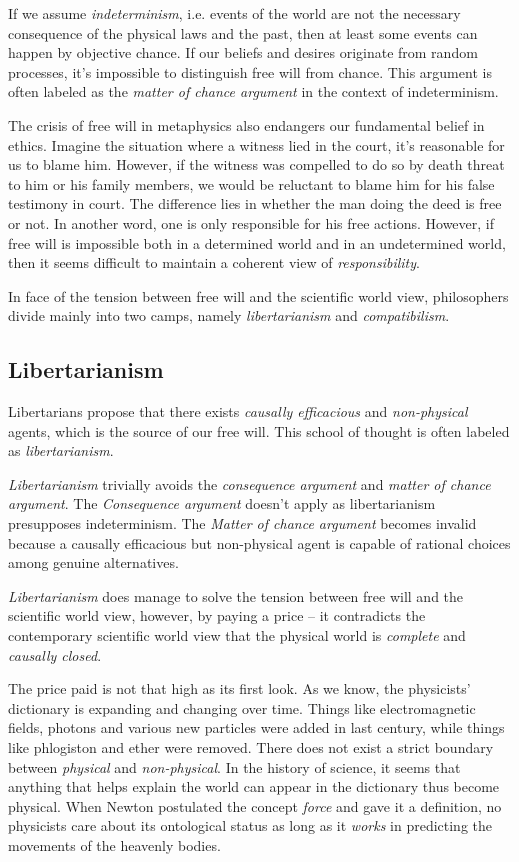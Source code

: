 If we assume \emph{indeterminism}, i.e. events of the world are not the necessary consequence of the physical laws and the past, then at least some events can happen by objective chance. If our beliefs and desires originate from random processes, it’s impossible to distinguish free will from chance. This argument is often labeled as the \emph{matter of chance argument}\cite{van2000eighth} in the context of indeterminism.

The crisis of free will in metaphysics also endangers our fundamental belief in ethics. Imagine the situation where a witness lied in the court, it's reasonable for us to blame him. However, if the witness was compelled to do so by death threat to him or his family members, we would be reluctant to blame him for his false testimony in court. The difference lies in whether the man doing the deed is free or not. In another word, one is only responsible for his free actions. However, if free will is impossible both in a determined world and in an undetermined world, then it seems difficult to maintain a coherent view of \emph{responsibility}.

In face of the tension between free will and the scientific world view, philosophers divide mainly into two camps, namely \emph{libertarianism} and \emph{compatibilism}.

\subsection{Libertarianism}

Libertarians propose that there exists \emph{causally efficacious} and \emph{non-physical} agents, which is the source of our free will. This school of thought is often labeled as \emph{libertarianism}.

\emph{Libertarianism} trivially avoids the \emph{consequence argument} and \emph{matter of chance argument}. The \emph{Consequence argument} doesn't apply as libertarianism presupposes indeterminism. The \emph{Matter of chance argument} becomes invalid because a causally efficacious but non-physical agent is capable of rational choices among genuine alternatives.

\emph{Libertarianism} does manage to solve the tension between free will and the scientific world view, however, by paying a price -- it contradicts the contemporary scientific world view that the physical world is \emph{complete} and \emph{causally closed}.

The price paid is not that high as its first look. As we know, the physicists' dictionary is expanding and changing over time. Things like electromagnetic fields, photons and various new particles were added in last century, while things like phlogiston and ether were removed. There does not exist a strict boundary between \emph{physical} and \emph{non-physical}. In the history of science, it seems that anything that helps explain the world can appear in the dictionary thus become physical. When Newton postulated the concept \emph{force} and gave it a definition, no physicists care about its ontological status as long as it \emph{works} in predicting the movements of the heavenly bodies.

